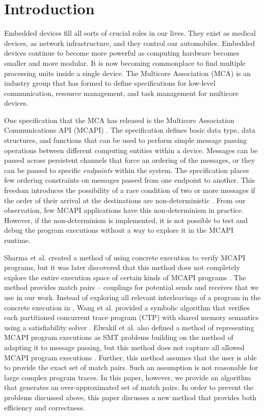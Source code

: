 \section{Introduction}
Embedded devices fill all sorts of crucial roles in our lives. They exist as
medical devices, as network infrastructure, and they control our automobiles.
Embedded devices continue to become more powerful as computing hardware becomes
smaller and more modular. It is now becoming commonplace to find multiple
processing units inside a single device. The Multicore Association (MCA) \cite{mca} is an
industry group that has formed to define specifications for low-level
communication, resource management, and task management for
multicore devices.

One specification that the MCA has released is the Multicore Association
Communications API (MCAPI) \cite{mcapi}. The specification defines basic data type, data
structures, and functions that can be used to perform simple message passing
operations between different computing entities within a device. Messages can be
passed across persistent channels that force an ordering of the messages, or
they can be passed to specific \emph{endpoints} within the system. The specification places few ordering constraints on messages passed from one
endpoint to another. This freedom introduces the possibility of a race condition of two or more messages if the order of their arrival at the destinations are non-deterministic \cite{netzer:spdt96}. From our observation, few MCAPI applications have this non-determinism in practice. However, if the non-determinism is implemented, it is not possible to test and debug the program executions without a way to explore it in the MCAPI runtime.

Sharma et al. created a method of using concrete execution to verify MCAPI
programs, but it was later discovered that this method does not completely
explore the entire execution space of certain kinds of MCAPI programs \cite{sharma:fmcad09}. The method provides match pairs -- couplings for potential sends and receives that we use in our work. Instead of exploring all relevant interleavings of a program in the concrete execution in \cite{sharma:fmcad09}, Wang et al. provided a symbolic algorithm that verifies each partitioned concurrent trace program (CTP) with shared memory semantics using a satisfiability solver \cite{wang:fse09}. Elwakil et al. also defined a method of representing MCAPI program executions as SMT problems building on the method of \cite{wang:fse09} adapting it to message passing, but this method does not capture all allowed MCAPI program executions \cite{elwakil:padtad10}. Further, this method assumes that the user is able to provide the exact set of match pairs. Such an assumption is not reasonable for large complex program traces. In this paper, however, we provide an algorithm that generates an over-approximated set of match pairs. In order to prevent the problems discussed above, this paper discusses a new method that provides both efficiency and correctness.

